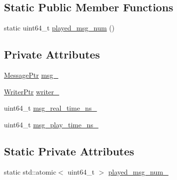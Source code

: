 \subsection*{Static Public Member Functions}
\begin{DoxyCompactItemize}
\item 
static uint64\-\_\-t \hyperlink{classapollo_1_1cyber_1_1record_1_1PlayTask_ae7df85963bce5bba5df858ad2387de6c}{played\-\_\-msg\-\_\-num} ()
\end{DoxyCompactItemize}
\subsection*{Private Attributes}
\begin{DoxyCompactItemize}
\item 
\hyperlink{classapollo_1_1cyber_1_1record_1_1PlayTask_a77f6d771bbb5a21c67a533a3c36efb77}{Message\-Ptr} \hyperlink{classapollo_1_1cyber_1_1record_1_1PlayTask_ac0c040bc6bd5628570185f0e4ffbdeef}{msg\-\_\-}
\item 
\hyperlink{classapollo_1_1cyber_1_1record_1_1PlayTask_ab836ae21967a8fc00e1b556152bbfc9a}{Writer\-Ptr} \hyperlink{classapollo_1_1cyber_1_1record_1_1PlayTask_ae2caf470e78e9d706b321d9891d9f44b}{writer\-\_\-}
\item 
uint64\-\_\-t \hyperlink{classapollo_1_1cyber_1_1record_1_1PlayTask_af16f2eb40c896c70086bdc41207cb5b8}{msg\-\_\-real\-\_\-time\-\_\-ns\-\_\-}
\item 
uint64\-\_\-t \hyperlink{classapollo_1_1cyber_1_1record_1_1PlayTask_a02659dc739c25371b3062e6dd3a5bb57}{msg\-\_\-play\-\_\-time\-\_\-ns\-\_\-}
\end{DoxyCompactItemize}
\subsection*{Static Private Attributes}
\begin{DoxyCompactItemize}
\item 
static std\-::atomic$<$ uint64\-\_\-t $>$ \hyperlink{classapollo_1_1cyber_1_1record_1_1PlayTask_a5dd34256985b04cbd9e22e57cd5d5f61}{played\-\_\-msg\-\_\-num\-\_\-}
\end{DoxyCompactItemize}


